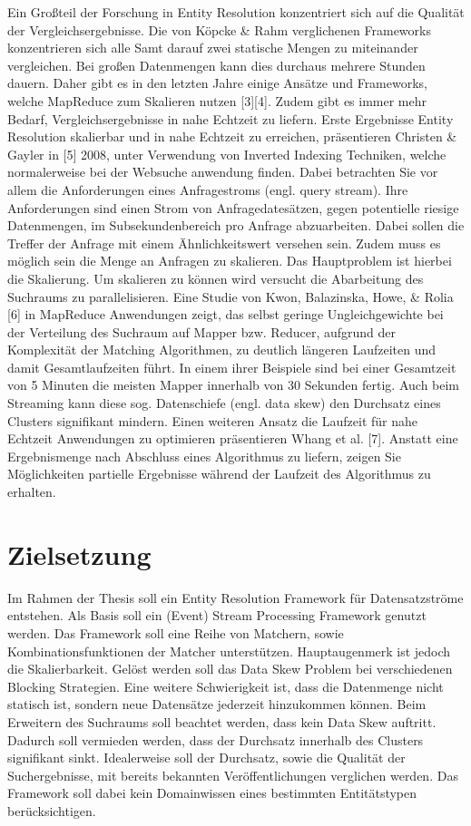 \documentclass[%
	paper=A4,					%
	twoside=true,				%
	openright,					%
	parskip=full,				%
	chapterprefix=true,			%
	11pt,						%
	headings=normal,			%
	bibliography=totoc,			%
	listof=totoc,				%
	titlepage=on,				%
	captions=tableabove,		%
	draft=false,				%
]{scrreprt}%
\begin{document}
Ein Großteil der Forschung in Entity Resolution konzentriert sich auf
die Qualität der Vergleichsergebnisse. Die von Köpcke \& Rahm
verglichenen Frameworks konzentrieren sich alle Samt darauf zwei
statische Mengen zu miteinander vergleichen. Bei großen Datenmengen kann
dies durchaus mehrere Stunden dauern. Daher gibt es in den letzten Jahre
einige Ansätze und Frameworks, welche MapReduce zum Skalieren nutzen
{[}3{]}{[}4{]}. Zudem gibt es immer mehr Bedarf, Vergleichsergebnisse in
nahe Echtzeit zu liefern. Erste Ergebnisse Entity Resolution skalierbar
und in nahe Echtzeit zu erreichen, präsentieren Christen \& Gayler in
{[}5{]} 2008, unter Verwendung von Inverted Indexing Techniken, welche
normalerweise bei der Websuche anwendung finden. Dabei betrachten Sie
vor allem die Anforderungen eines Anfragestroms (engl. query stream).
Ihre Anforderungen sind einen Strom von Anfragedatesätzen, gegen
potentielle riesige Datenmengen, im Subsekundenbereich pro Anfrage
abzuarbeiten. Dabei sollen die Treffer der Anfrage mit einem
Ähnlichkeitswert versehen sein. Zudem muss es möglich sein die Menge an
Anfragen zu skalieren. Das Hauptproblem ist hierbei die Skalierung. Um
skalieren zu können wird versucht die Abarbeitung des Suchraums zu
parallelisieren. Eine Studie von Kwon, Balazinska, Howe, \& Rolia
{[}6{]} in MapReduce Anwendungen zeigt, das selbst geringe
Ungleichgewichte bei der Verteilung des Suchraum auf Mapper bzw.
Reducer, aufgrund der Komplexität der Matching Algorithmen, zu deutlich
längeren Laufzeiten und damit Gesamtlaufzeiten führt. In einem ihrer
Beispiele sind bei einer Gesamtzeit von 5 Minuten die meisten Mapper
innerhalb von 30 Sekunden fertig. Auch beim Streaming kann diese sog.
Datenschiefe (engl. data skew) den Durchsatz eines Clusters signifikant
mindern. Einen weiteren Ansatz die Laufzeit für nahe Echtzeit
Anwendungen zu optimieren präsentieren Whang et al. {[}7{]}. Anstatt
eine Ergebnismenge nach Abschluss eines Algorithmus zu liefern, zeigen
Sie Möglichkeiten partielle Ergebnisse während der Laufzeit des
Algorithmus zu erhalten.

\chapter{Zielsetzung}\label{sec:ziele}

Im Rahmen der Thesis soll ein Entity Resolution Framework für
Datensatzströme entstehen. Als Basis soll ein (Event) Stream Processing
Framework genutzt werden. Das Framework soll eine Reihe von Matchern,
sowie Kombinationsfunktionen der Matcher unterstützen. Hauptaugenmerk
ist jedoch die Skalierbarkeit. Gelöst werden soll das Data Skew Problem
bei verschiedenen Blocking Strategien. Eine weitere Schwierigkeit ist,
dass die Datenmenge nicht statisch ist, sondern neue Datensätze
jederzeit hinzukommen können. Beim Erweitern des Suchraums soll beachtet
werden, dass kein Data Skew auftritt. Dadurch soll vermieden werden,
dass der Durchsatz innerhalb des Clusters signifikant sinkt.
Idealerweise soll der Durchsatz, sowie die Qualität der Suchergebnisse,
mit bereits bekannten Veröffentlichungen verglichen werden. Das
Framework soll dabei kein Domainwissen eines bestimmten Entitätstypen
berücksichtigen.
\end{document}
